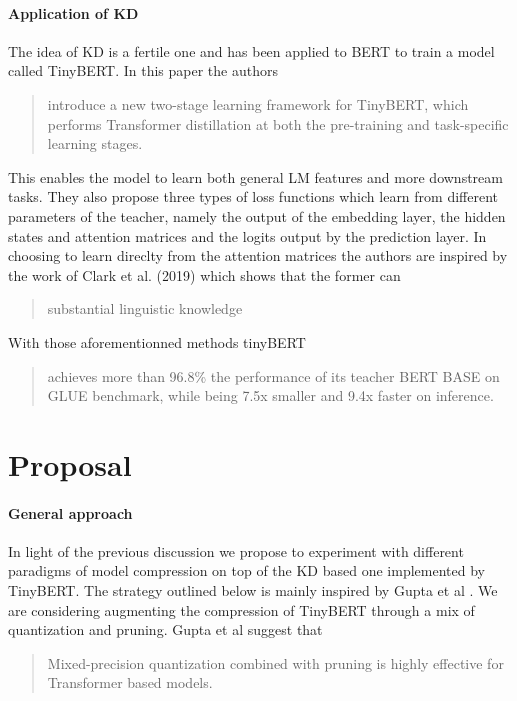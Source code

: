 \documentclass{article}
\begin{document}
\paragraph{Application of KD} The idea of KD is a fertile one and has been
applied to BERT to train a model called TinyBERT\cite{tinybert}. In this paper
the authors \blockcquote{tinybert}{introduce a new two-stage learning framework
for TinyBERT, which performs Transformer distillation at both the pre-training
and task-specific learning stages.} This enables the model to learn both general
LM features and more downstream tasks. They also propose three types of loss
functions which learn from different parameters of the teacher, namely the
output of the embedding layer, the hidden states and attention matrices and the
logits output by the prediction layer. In choosing to learn direclty from the
attention matrices the authors are inspired by the work of Clark et al.
(2019)\cite{whatdoesbertlookat} which shows that the former can
\blockcquote{tinybert}{substantial linguistic knowledge}. With those
aforementionned methods tinyBERT \blockcquote{tinybert}{ achieves more than
96.8\% the performance of its teacher BERT BASE on GLUE benchmark,  while
being 7.5x smaller and 9.4x faster on inference.}



\section{Proposal}

\paragraph{General approach}In light of the previous discussion we propose to
experiment with different paradigms of model compression on top of the KD based
one implemented by TinyBERT. The strategy outlined below is mainly inspired by
Gupta et al \cite{gupta2020compression}.  We are considering augmenting the
compression of TinyBERT through a mix of quantization and pruning.  Gupta et al
suggest that \blockcquote{gupta2020compression}{Mixed-precision quantization
combined with pruning is highly effective for Transformer based models.}
\end{document}
